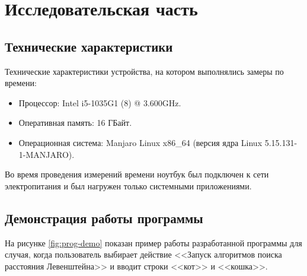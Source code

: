 \chapter{Исследовательская часть}

\section{Технические характеристики}

Технические характеристики устройства, на котором выполнялись замеры по времени:

\begin{itemize}
    \item Процессор: Intel i5-1035G1 (8) @ 3.600GHz.
    \item Оперативная память: 16 ГБайт.
    \item Операционная система: Manjaro Linux x86\_64 (версия ядра Linux 5.15.131-1-MANJARO).
\end{itemize}

Во время проведения измерений времени ноутбук был подключен к сети электропитания и был нагружен только системными приложениями.

\section{Демонстрация работы программы}

На рисунке \ref{fig:prog-demo} показан пример работы разработанной программы для случая, когда пользователь выбирает действие <<Запуск алгоритмов поиска расстояния Левенштейна>> и вводит строки <<кот>> и <<кошка>>.

